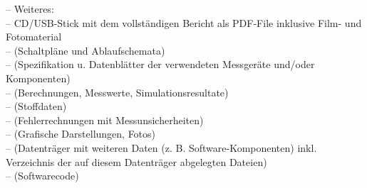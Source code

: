 \documentclass[%
  a4paper,
  twoside,
  numbers=noenddot,
  parskip=half+,
  open=any,
  headsepline,
  english, %
  ba  %
]{zhawthesis}
\begin{document}
\begin{appendices}
{  \quad -- Weiteres: \\ %
  \qquad -- CD/USB-Stick mit dem vollständigen Bericht als PDF-File inklusive Film- und Fotomaterial \\ %
  \qquad -- (Schaltpläne und Ablaufschemata) \\ %
  \qquad -- (Spezifikation u. Datenblätter der verwendeten Messgeräte und/oder Komponenten) \\ %
  \qquad -- (Berechnungen, Messwerte, Simulationsresultate) \\ %
  \qquad -- (Stoffdaten) \\ %
  \qquad -- (Fehlerrechnungen mit Messunsicherheiten) \\ %
  \qquad -- (Grafische Darstellungen, Fotos) \\ %
  \qquad -- (Datenträger mit weiteren Daten (z. B. Software-Komponenten) inkl. Verzeichnis der auf diesem Datenträger abgelegten Dateien) \\ %
  \qquad -- (Softwarecode) %
}

\end{appendices}
\end{document}
